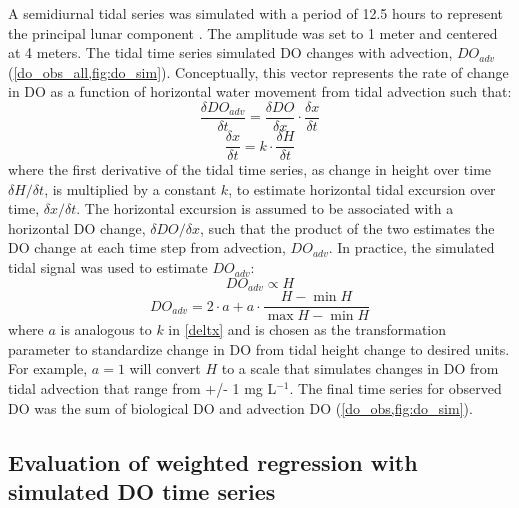 \documentclass[letterpaper,12pt,oneside]{article}\usepackage[]{graphicx}\usepackage[]{color}
\begin{document}
A semidiurnal tidal series was simulated with a period of 12.5 hours to represent the principal lunar component \citep{Foreman89}.  The amplitude was set to 1 meter and centered  at 4 meters.  The tidal time series simulated \ac{DO} changes with advection, $DO_{adv}$ (\cref{do_obs_all,fig:do_sim}). Conceptually, this vector represents the rate of change in \ac{DO} as a function of horizontal water movement from tidal advection such that:
\begin{equation} \label{deltdo}
\frac{\delta DO_{adv}}{\delta t} = \frac{\delta DO}{\delta x} \cdot \frac{\delta x}{\delta t}
\end{equation}
\begin{equation} \label{deltx}
\frac{\delta x}{\delta t} = k \cdot \frac{\delta H}{\delta t}
\end{equation}
where the first derivative of the tidal time series, as change in height over time $\delta H / \delta t$, is multiplied by a constant $k$, to estimate horizontal tidal excursion over time, $\delta x / \delta t$.  The horizontal excursion is assumed to be associated with a horizontal \ac{DO} change, $\delta DO / \delta x$, such that the product of the two estimates the \ac{DO} change at each time step from advection, $DO_{adv}$. In practice, the simulated tidal signal was used to estimate $DO_{adv}$:
\begin{equation} \label{do_advp}
DO_{adv} \propto H
\end{equation}
\begin{equation} \label{do_adv}
DO_{adv} = 2\cdot a + a \cdot \frac{H- \min H}{\max H - \min H}
\end{equation}
where $a$ is analogous to $k$ in \cref{deltx} and is chosen as the transformation parameter to standardize change in \ac{DO} from tidal height change to desired units.  For example, $a = 1$ will convert $H$ to a scale that simulates changes in \ac{DO} from tidal advection that range from +/- 1 mg L$^{-1}$.  The final time series for observed \ac{DO} was the sum of biological \ac{DO} and advection \ac{DO} (\cref{do_obs,fig:do_sim}).

\subsection{Evaluation of weighted regression with simulated \ac{DO} time series}
\end{document}
